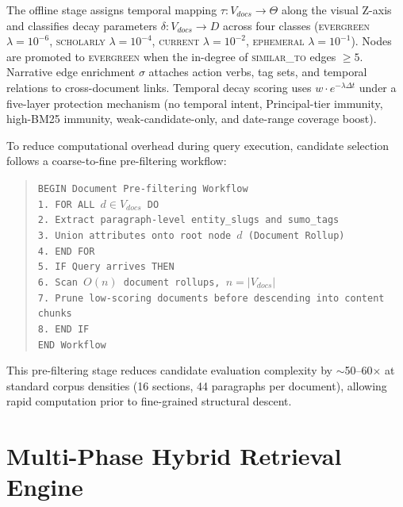 \documentclass[conference,a4paper]{IEEEtran}
\begin{document}
The offline stage assigns temporal mapping $\tau: V_{docs} \to \Theta$ along the visual Z-axis and classifies decay parameters $\delta: V_{docs} \to D$ across four classes (\textsc{evergreen} $\lambda{=}10^{-6}$, \textsc{scholarly} $\lambda{=}10^{-4}$, \textsc{current} $\lambda{=}10^{-2}$, \textsc{ephemeral} $\lambda{=}10^{-1}$). Nodes are promoted to \textsc{evergreen} when the in-degree of \textsc{similar\_to} edges $\geq 5$. Narrative edge enrichment $\sigma$ attaches action verbs, tag sets, and temporal relations to cross-document links. Temporal decay scoring uses $w \cdot e^{-\lambda \Delta t}$ under a five-layer protection mechanism (no temporal intent, Principal-tier immunity, high-BM25 immunity, weak-candidate-only, and date-range coverage boost).

To reduce computational overhead during query execution, candidate selection follows a coarse-to-fine pre-filtering workflow:

\begin{quote}
\small
\texttt{BEGIN Document Pre-filtering Workflow}\\
\texttt{1. FOR ALL $d \in V_{docs}$ DO}\\
\texttt{2. \quad Extract paragraph-level entity\_slugs and sumo\_tags}\\
\texttt{3. \quad Union attributes onto root node $d$ (Document Rollup)}\\
\texttt{4. END FOR}\\
\texttt{5. IF Query arrives THEN}\\
\texttt{6. \quad Scan $O(n)$ document rollups, $n = |V_{docs}|$}\\
\texttt{7. \quad Prune low-scoring documents before descending into content chunks}\\
\texttt{8. END IF}\\
\texttt{END Workflow}
\end{quote}

This pre-filtering stage reduces candidate evaluation complexity by $\sim$50--60$\times$ at standard corpus densities (16 sections, 44 paragraphs per document), allowing rapid computation prior to fine-grained structural descent.

\section{Multi-Phase Hybrid Retrieval Engine}
\end{document}
